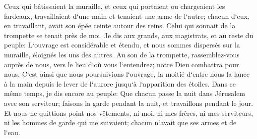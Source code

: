 \verse Ceux qui bâtissaient la muraille, et ceux qui portaient ou chargeaient les fardeaux, travaillaient d`une main et tenaient une arme de l`autre; 
\verse chacun d`eux, en travaillant, avait son épée ceinte autour des reins. Celui qui sonnait de la trompette se tenait près de moi. 
\verse Je dis aux grands, aux magistrats, et au reste du peuple: L`ouvrage est considérable et étendu, et nous sommes dispersés sur la muraille, éloignés les uns des autres. 
\verse Au son de la trompette, rassemblez-vous auprès de nous, vers le lieu d`où vous l`entendrez; notre Dieu combattra pour nous. 
\verse C`est ainsi que nous poursuivions l`ouvrage, la moitié d`entre nous la lance à la main depuis le lever de l`aurore jusqu`à l`apparition des étoiles. 
\verse Dans ce même temps, je dis encore au peuple: Que chacun passe la nuit dans Jérusalem avec son serviteur; faisons la garde pendant la nuit, et travaillons pendant le jour. 
\verse Et nous ne quittions point nos vêtements, ni moi, ni mes frères, ni mes serviteurs, ni les hommes de garde qui me suivaient; chacun n`avait que ses armes et de l`eau. 

